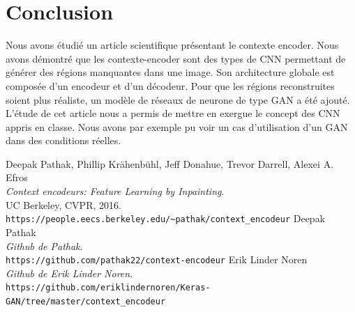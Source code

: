 \documentclass[11pt,a4paper]{article}
\begin{document}
    \section{Conclusion}
    Nous avons étudié un article scientifique présentant le contexte encoder. Nous avons démontré que les contexte-encoder sont des types de CNN permettant de générer des régions manquantes dans une image. Son architecture globale est composée d’un encodeur et d’un décodeur. Pour que les régions reconstruites soient plus réaliste, un modèle de réseaux de neurone de type GAN a été ajouté.\\ 
    L’étude de cet article nous a permis de mettre en exergue le concept des CNN appris en classe. Nous avons par exemple pu voir un cas d'utilisation d'un GAN dans des conditions réelles.

    \newpage
    \listoffigures
    \newpage



    \begin{thebibliography}{9}
            Deepak Pathak, Phillip Krähenbühl, Jeff Donahue, Trevor Darrell, Alexei A. Efros\\
            \textit{Context encodeurs: Feature Learning by Inpainting}.\\
            UC Berkeley, CVPR, 2016.
            \\\texttt{https://people.eecs.berkeley.edu/\~{}pathak/context\_encodeur}
            Deepak Pathak\\
            \textit{Github de Pathak}.
            \\\texttt{https://github.com/pathak22/context-encodeur}
            Erik Linder Noren\\
            \textit{Github de Erik Linder Noren}.
            \\\texttt{https://github.com/eriklindernoren/Keras-GAN/tree/master/context\_encodeur}
    \end{thebibliography}
\end{document}
